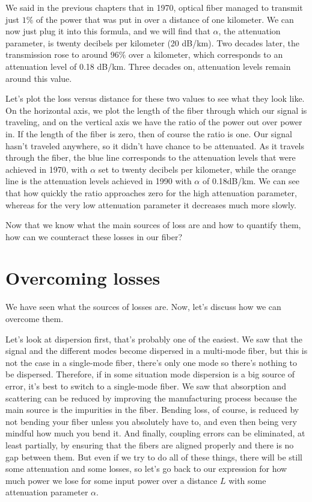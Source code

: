 We said in the previous chapters that in 1970, optical fiber managed to transmit just $1\%$ of the power that was put in over a distance of one kilometer. We can now just plug it into this formula, and we will find that $\alpha$, the attenuation parameter, is twenty decibels per kilometer (20 dB/km). Two decades later, the transmission rose to around $96\%$ over a kilometer, which corresponds to an attenuation level of 0.18 dB/km. Three decades on, attenuation levels remain around this value.

Let's plot the loss versus distance for these two values to see what they look like.  On the horizontal axis, we plot the length of the fiber through which our signal is traveling, and on the vertical axis we have the ratio of the power out over power in. If the length of the fiber is zero, then of course the ratio is one. Our signal hasn't traveled anywhere, so it didn't have chance to be attenuated. As it travels through the fiber, the blue line corresponds to the attenuation levels that were achieved in 1970, with $\alpha$ set to twenty decibels per kilometer, while the orange line is the attenuation levels achieved  in 1990 with $\alpha$ of 0.18dB/km. We can see that how quickly the ratio approaches zero for the high attenuation parameter, whereas for the very low attenuation parameter it decreases much more slowly.

Now that we know what the main sources of loss are and how to quantify them, how can we counteract these losses in our fiber?

\section{Overcoming losses}
\label{sec:11-4_overcoming_losses}

We have seen what the sources of losses are. Now, let's discuss how we can overcome them.

Let's look at dispersion first, that's probably one of the easiest. We saw that the signal and the different modes become dispersed in a multi-mode fiber, but this is not the case in a single-mode fiber, there's only one mode so there's nothing to be dispersed. Therefore, if in some situation mode dispersion is a big source of error, it's best to switch to a single-mode fiber. We saw that absorption and scattering can be reduced by improving the manufacturing process because the main source is the impurities in the fiber. Bending loss, of course, is reduced by not bending your fiber unless you absolutely have to, and even then being very mindful how much you bend it. And finally, coupling errors can be eliminated, at least partially, by ensuring that the fibers are aligned properly and there is no gap between them. But even if we try to do all of these things, there will be still some attenuation and some losses, so let's go back to our expression for how much power we lose for some input power over a distance $L$ with some attenuation parameter $\alpha$.

